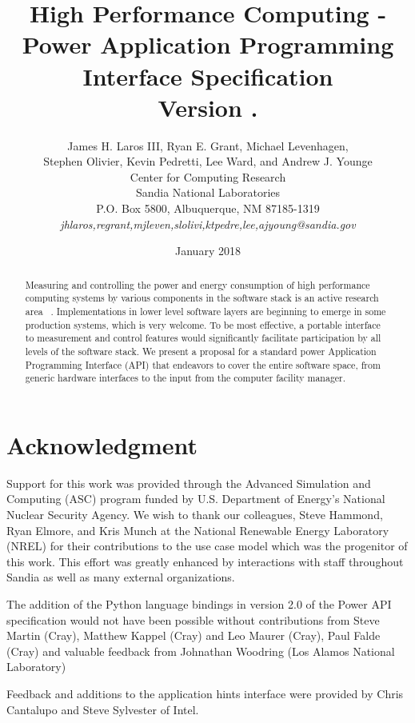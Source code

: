 \documentclass[12pt]{report}
\title{High Performance Computing - Power Application Programming Interface Specification \\ Version \majorversion.\minorversion }
\author{James H. Laros III, Ryan E. Grant, Michael Levenhagen,\\
Stephen Olivier, Kevin Pedretti, Lee Ward, and Andrew J. Younge\\
Center for Computing Research\\
Sandia National Laboratories\\
P.O. Box 5800, Albuquerque, NM 87185-1319\\ 
\textit{jhlaros,regrant,mjleven,slolivi,ktpedre,lee,ajyoung@sandia.gov}
}
\date{January 2018}
\begin{document}
\maketitle
\begin{abstract}
Measuring and controlling the power and energy consumption of high performance computing systems by various components in the software stack is an active research area 
~\cite{6604474,6604496,
5488433,
Liu:2012:RCA:2318857.2254779,
Chen:2013:DSP:2561828.2561853,
Yang:2013:IDP:2503210.2503264,
Wallace:2013:CLUSTER:2503210.2503264,
Shoukourian2013,
conf:icdcn:GeorgiouCGAJH14,
Trader:2013:report:GreenComputing,
6337489,
Vishnu:2013:JSC:s11227-011-0699-9,
Mills:2013:EES:2536430.2536432,
Bertran:2013:IBM:2012.2227580,
Georgiou:2013:Bull,
6604481,
6604508}.
Implementations in lower level software layers are beginning to emerge in some production systems, which is very welcome.
To be most effective, a portable interface to measurement and control features would significantly facilitate participation by all levels of the software stack.
We present a proposal for a standard power Application Programming Interface (API) that endeavors to cover the entire software space, from generic hardware interfaces to the input from the computer facility manager.

    \end{abstract}
    \chapter*{Acknowledgment}
Support for this work was provided through the Advanced Simulation and Computing (ASC) program funded by U.S. Department of Energy's National Nuclear Security Agency.
We wish to thank our colleagues, Steve Hammond, Ryan Elmore, and Kris Munch at the National Renewable Energy Laboratory (NREL) for their contributions to the use case model which was the progenitor of this work.
This effort was greatly enhanced by interactions with staff throughout Sandia as well as many external organizations. 

The addition of the Python language bindings in version 2.0 of the Power API specification would not have been possible without contributions from Steve Martin (Cray), Matthew Kappel (Cray) and Leo Maurer (Cray), Paul Falde (Cray) and valuable feedback from Johnathan Woodring (Los Alamos National Laboratory)

Feedback and additions to the application hints interface were provided by Chris Cantalupo and Steve Sylvester of Intel.
\end{document}
